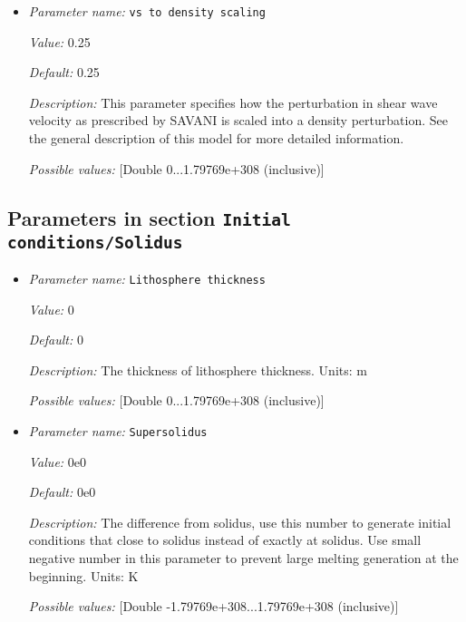 \begin{itemize}
{\it Default:} 2e-5


{\it Description:} The value of the thermal expansion coefficient $\beta$. Units: $1/K$.


{\it Possible values:} [Double 0...1.79769e+308 (inclusive)]
\item {\it Parameter name:} {\tt vs to density scaling}
\label{parameters:Initial conditions/SAVANI perturbation/vs to density scaling}


{\it Value:} 0.25


{\it Default:} 0.25


{\it Description:} This parameter specifies how the perturbation in shear wave velocity as prescribed by SAVANI is scaled into a density perturbation. See the general description of this model for more detailed information.


{\it Possible values:} [Double 0...1.79769e+308 (inclusive)]
\end{itemize}

\subsection{Parameters in section \tt Initial conditions/Solidus}
\label{parameters:Initial_20conditions/Solidus}

\begin{itemize}
\item {\it Parameter name:} {\tt Lithosphere thickness}
\label{parameters:Initial conditions/Solidus/Lithosphere thickness}


{\it Value:} 0


{\it Default:} 0


{\it Description:} The thickness of lithosphere thickness. Units: m


{\it Possible values:} [Double 0...1.79769e+308 (inclusive)]
\item {\it Parameter name:} {\tt Supersolidus}
\label{parameters:Initial conditions/Solidus/Supersolidus}


{\it Value:} 0e0


{\it Default:} 0e0


{\it Description:} The difference from solidus, use this number to generate initial conditions that close to solidus instead of exactly at solidus. Use small negative number in this parameter to prevent large melting generation at the beginning.   Units: K 


{\it Possible values:} [Double -1.79769e+308...1.79769e+308 (inclusive)]
\end{itemize}



